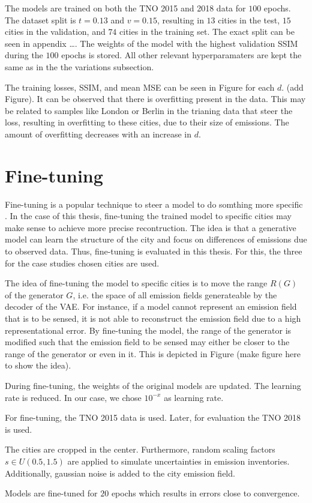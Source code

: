 The models are trained on both the TNO 2015 and 2018 data for $100$ epochs.
The dataset split is $t = 0.13$ and $v = 0.15$, resulting in $13$ cities in the test, $15$ cities in the validation, and $74$ cities in the training set.
The exact split can be seen in appendix \dots.
The weights of the model with the highest validation SSIM during the $100$ epochs is stored.
All other relevant hyperparamaters are kept the same as in the the variations subsection.

The training losses, SSIM, and mean MSE can be seen in Figure for each $d$.
(add Figure).
It can be observed that there is overfitting present in the data.
This may be related to samples like London or Berlin in the trianing data that steer the loss, resulting in overfitting to these cities, due to their size of emissions.
The amount of overfitting decreases with an increase in $d$.


\section{Fine-tuning}
Fine-tuning is a popular technique to steer a model to do somthing more specific \cite{FineTuning}.
In the case of this thesis, fine-tuning the trained model to specific cities may make sense to achieve more precise recontruction.
The idea is that a generative model can learn the structure of the city and focus on differences of emissions due to observed data.
Thus, fine-tuning is evaluated in this thesis.
For this, the three for the case studies chosen cities are used.

The idea of fine-tuning the model to specific cities is to move the range $R(G)$ of the generator $G$, i.e. the space of all emission fields generateable by the decoder of the VAE.
For instance, if a model cannot represent an emission field that is to be sensed, it is not able to reconstruct the emission field due to a high representational error.
By fine-tuning the model, the range of the generator is modified such that the emission field to be sensed may either be closer to the range of the generator or even in it.
This is depicted in Figure (make figure here to show the idea).

During fine-tuning, the weights of the original models are updated.
The learning rate is reduced.
In our case, we chose $10^{-x}$ as learning rate.

For fine-tuning, the TNO 2015 data is used.
Later, for evaluation the TNO 2018 is used.

The cities are cropped in the center.
Furthermore, random scaling factors $s \in U(0.5, 1.5)$ are applied to simulate uncertainties in emission inventories.
Additionally, gaussian noise is added to the city emission field.

Models are fine-tuned for $20$ epochs which results in errors close to convergence.

